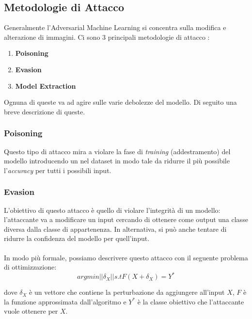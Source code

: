 \subsection{Metodologie di Attacco}
Generalmente l'Adversarial Machine Learning si concentra sulla modifica e alterazione di immagini. Ci sono 3 principali metodologie di attacco \cite{adversarial}:

\begin{enumerate}
    \item \textbf{Poisoning}
    \item \textbf{Evasion}
    \item \textbf{Model Extraction}
\end{enumerate}
Ognuna di queste va ad agire sulle varie debolezze del modello. Di seguito una breve descrizione di queste.

\subsubsection{Poisoning}

Questo tipo di attacco mira a violare la fase di \textit{training} (addestramento) del modello introducendo un  nel dataset in modo tale da ridurre il più possibile l'\textit{accuracy} per tutti i possibili input.

\subsubsection{Evasion} 


L'obiettivo di questo attacco è quello di violare l'integrità di un modello: l'attaccante va a modificare un input cercando di ottenere come output una classe diversa dalla classe di appartenenza. In alternativa, si può anche tentare di ridurre la confidenza del modello per quell'input.\\
\\
In modo più formale, possiamo descrivere questo attacco con il seguente problema di ottimizzazione:
\[ arg min ||\delta_X|| s.t F(X + \delta_X) = Y^*\]

dove \(\delta_X\) è un vettore che contiene la perturbazione da aggiungere all'input \(X\), \(F\) è la funzione approssimata dall'algoritmo e \(Y^*\) è la classe obiettivo che l'attaccante vuole ottenere per \(X\). 

